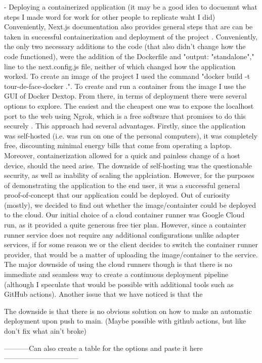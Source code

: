 - Deploying a containerized application (it may be a good idea to docuemnt what steps I made word for work for other people to replicate waht I did)
Conveniently, Next.js documentation also provides general steps that are can be taken in successful containerization and deployment of the project \cite{vercelMainDeploymentMainPage}\cite{next.js/examples/with-docker}. Conveniently, the only two necessary additions to the code (that also didn't change how the code functioned), were the addition of the Dockerfile \cite{next.js/examples/with-docker/Dockerfile} and "output: "standalone"," line to the next.config.js file, neither of which changed how the application worked. To create an image of the project I used the command "docker build -t tour-de-face-docker .". To create and run a container from the image I use the GUI of Docker Dextop. From there, in terms of deployment there were several options to explore. The easiest and the cheapest one was to expose the localhost port to the web using Ngrok, which is a free software that promises to do this securely \cite{ngrokMain} \cite{ngrokMainDocs}. This approach had several advantages. Firstly, since the application was self-hosted (i.e. was run on one of the personal computers), it was completely free, discounting minimal energy bills that come from operating a laptop. Moreover, containerization allowed for a quick and painless change of a host device, should the need arise. The downside of self-hosting was the questionable security, as well as inability of scaling the applciation. However, for the purposes of demonstrating the application to the end user, it was a successful general proof-of-concept that our application could be deployed. Out of curiosity (mostly), we decided to find out whether the image/containter could be deployed to the cloud. Our initial choice of a cloud container runner was Google Cloud run, as it provided a quite generous free tier plan. However, since a containter runner service does not require any additional configurations unlike adapter services, if for some reason we or the client decides to switch the container runner provider, that would be a matter of uploading the image/container to the service. The major downside of using the cloud runners though is that there is no immediate and seamless way to create a continuous deployment pipeline (although I speculate that would be possible with additional tools such as GitHub actions). Another issue that we have noticed is that the 

The downside is that there is no obvious solution on how to make an automatic deployment upon push to main. (Maybe possible with github actions, but like don't fix what ain't broke)

-----------Can also create a table for the options and paste it here--------------------------------